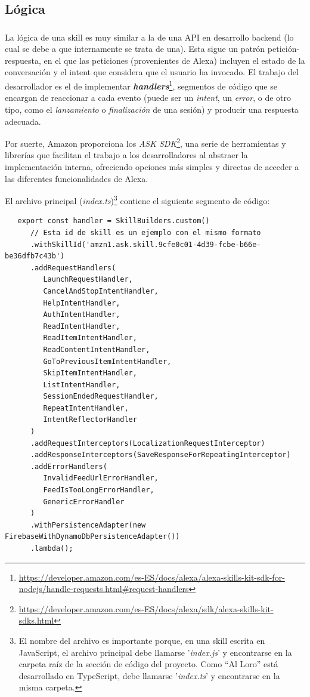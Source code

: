 \documentclass[11pt,spanish,listoffigures,listoftables,table,hyphens,dvipsnames]{tfgetsinf}
\newcommand{\fe}[1]{\foreign{english}{#1}}
\begin{document}
\subsection{Lógica}

\subsubsection{\fe{Handlers}}

La lógica de una skill es muy similar a la de una API en desarrollo backend (lo cual se debe a que internamente se trata de una). Esta sigue un patrón petición-respuesta, en el que las peticiones (provenientes de Alexa) incluyen el estado de la conversación y el intent que considera que el usuario ha invocado. El trabajo del desarrollador es el de implementar
\textbf{\emph{handlers}}\footnote{\url{https://developer.amazon.com/es-ES/docs/alexa/alexa-skills-kit-sdk-for-nodejs/handle-requests.html\#request-handlers}},
segmentos de código que se encargan de reaccionar a cada evento (puede ser un \emph{intent}, un \emph{error}, o de otro tipo, como el \emph{lanzamiento} o \emph{finalización} de una sesión) y producir una respuesta adecuada.

Por suerte, Amazon proporciona los \emph{ASK SDK}\footnote{\url{https://developer.amazon.com/es-ES/docs/alexa/sdk/alexa-skills-kit-sdks.html}}, una serie de herramientas y librerías que facilitan el trabajo a los desarrolladores al abstraer la implementación interna, ofreciendo opciones más simples y directas de acceder a las diferentes funcionalidades de Alexa.

El archivo principal (\emph{index.ts})\footnote{El nombre del archivo es importante porque, en una skill escrita en JavaScript, el archivo principal debe llamarse '\emph{index.js}' y encontrarse en la carpeta raíz de la sección de código del proyecto. Como ``Al Loro'' está desarrollado en TypeScript, debe llamarse '\emph{index.ts}' y encontrarse en la misma carpeta.} contiene el siguiente segmento de código: 

\begin{lstlisting}
   export const handler = SkillBuilders.custom()
      // Esta id de skill es un ejemplo con el mismo formato
      .withSkillId('amzn1.ask.skill.9cfe0c01-4d39-fcbe-b66e-be36dfb7c43b') 
      .addRequestHandlers(
         LaunchRequestHandler,
         CancelAndStopIntentHandler,
         HelpIntentHandler,
         AuthIntentHandler,
         ReadIntentHandler,
         ReadItemIntentHandler,
         ReadContentIntentHandler,
         GoToPreviousItemIntentHandler,
         SkipItemIntentHandler,
         ListIntentHandler,
         SessionEndedRequestHandler,
         RepeatIntentHandler,
         IntentReflectorHandler
      )
      .addRequestInterceptors(LocalizationRequestInterceptor)
      .addResponseInterceptors(SaveResponseForRepeatingInterceptor)
      .addErrorHandlers(
         InvalidFeedUrlErrorHandler,
         FeedIsTooLongErrorHandler,
         GenericErrorHandler
      )
      .withPersistenceAdapter(new FirebaseWithDynamoDbPersistenceAdapter())
      .lambda();
\end{lstlisting}
\end{document}
